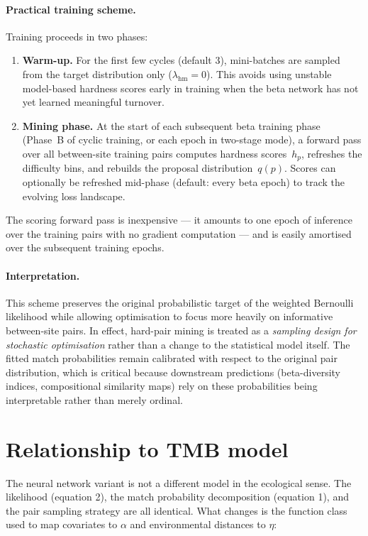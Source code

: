 \documentclass{article}
\begin{document}
\paragraph{Practical training scheme.}
Training proceeds in two phases:
\begin{enumerate}
    \item \textbf{Warm-up.} For the first few cycles (default 3), mini-batches are sampled from the target distribution only ($\lambda_{\text{hm}} = 0$). This avoids using unstable model-based hardness scores early in training when the beta network has not yet learned meaningful turnover.
    \item \textbf{Mining phase.} At the start of each subsequent beta training phase (Phase~B of cyclic training, or each epoch in two-stage mode), a forward pass over all between-site training pairs computes hardness scores~$h_p$, refreshes the difficulty bins, and rebuilds the proposal distribution~$q(p)$. Scores can optionally be refreshed mid-phase (default: every beta epoch) to track the evolving loss landscape.
\end{enumerate}

The scoring forward pass is inexpensive --- it amounts to one epoch of inference over the training pairs with no gradient computation --- and is easily amortised over the subsequent training epochs.

\paragraph{Interpretation.}
This scheme preserves the original probabilistic target of the weighted Bernoulli likelihood while allowing optimisation to focus more heavily on informative between-site pairs. In effect, hard-pair mining is treated as a \emph{sampling design for stochastic optimisation} rather than a change to the statistical model itself. The fitted match probabilities remain calibrated with respect to the original pair distribution, which is critical because downstream predictions (beta-diversity indices, compositional similarity maps) rely on these probabilities being interpretable rather than merely ordinal.

\section{Relationship to TMB model}

The neural network variant is not a different model in the ecological sense. The likelihood (equation 2), the match probability decomposition (equation 1), and the pair sampling strategy are all identical. What changes is the function class used to map covariates to $\alpha$ and environmental distances to $\eta$:
\end{document}
